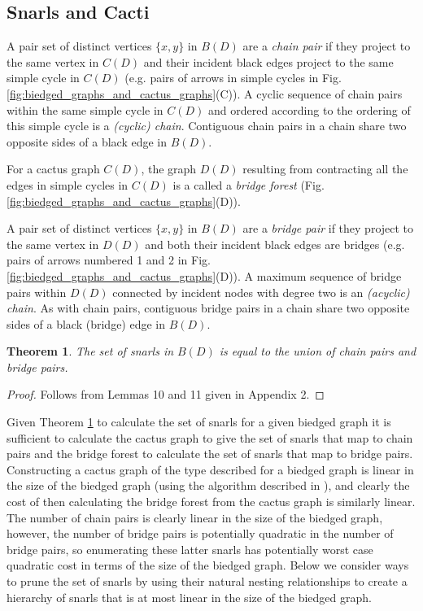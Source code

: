 \documentclass[11pt]{ucthesis}
\newtheorem{theorem}{Theorem}
\newtheorem*{proof}{Proof}
\begin{document}
\subsection{Snarls and Cacti}

A pair set of distinct vertices $\{ x, y \}$ in $B(D)$ are a \emph{chain pair} if they project to the same vertex in $C(D)$ and their incident black edges project to the same simple cycle in $C(D)$ (e.g. pairs of arrows in simple cycles  in Fig. \ref{fig:biedged_graphs_and_cactus_graphs}(C)). A cyclic sequence of chain pairs within the same simple cycle in $C(D)$ and ordered according to the ordering of this simple cycle is a \emph{(cyclic) chain}. Contiguous chain pairs in a chain share two opposite sides of a black edge in $B(D)$.

For a cactus graph $C(D)$, the graph $D(D)$ resulting from contracting all the edges in simple cycles in $C(D)$ is a called a \emph{bridge forest} (Fig. \ref{fig:biedged_graphs_and_cactus_graphs}(D)).

A pair set of distinct vertices $\{ x, y \}$ in $B(D)$ are a \emph{bridge pair} if they project to the same vertex in $D(D)$  and both their incident black edges are bridges (e.g. pairs of arrows numbered 1 and 2 in Fig. \ref{fig:biedged_graphs_and_cactus_graphs}(D)). A maximum sequence of bridge pairs within $D(D)$ connected by incident nodes with degree two is an \emph{(acyclic) chain}. As with chain pairs, contiguous bridge pairs in a chain share two opposite sides of a black (bridge) edge in $B(D)$.


\begin{theorem}
The set of snarls in $B(D)$ is equal to the union of chain pairs and bridge pairs.
\label{theorem_chain_and_bridge_pair_bijection_complex_bubbles}
\end{theorem}
\begin{proof}
Follows from Lemmas 10 and 11 given in Appendix 2.
\end{proof}

Given Theorem \ref{theorem_chain_and_bridge_pair_bijection_complex_bubbles} to calculate the set of snarls for a given biedged graph it is sufficient to calculate the cactus graph to give the set of snarls that map to chain pairs and the bridge forest to calculate the set of snarls that map to bridge pairs. Constructing a cactus graph of the type described for a biedged graph is linear in the size of the biedged graph (using the algorithm described in \cite{Paten:2011fv}), and clearly the cost of then calculating the bridge forest from the cactus graph is similarly linear. The number of chain pairs is clearly linear in the size of the biedged graph, however, the number of bridge pairs is potentially quadratic in the number of bridge pairs, so enumerating these latter snarls has potentially worst case quadratic cost in terms of the size of the biedged graph. Below we consider ways to prune the set of snarls by using their natural nesting relationships to create a hierarchy of snarls that is at most linear in the size of the biedged graph. 
\end{document}
